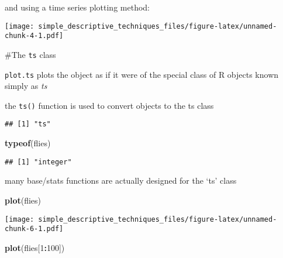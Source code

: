 \documentclass[]{article}
\newenvironment{Shaded}{\begin{snugshade}}{\end{snugshade}}
\newcommand{\DecValTok}[1]{\textcolor[rgb]{0.00,0.00,0.81}{#1}}
\newcommand{\KeywordTok}[1]{\textcolor[rgb]{0.13,0.29,0.53}{\textbf{#1}}}
\newcommand{\NormalTok}[1]{#1}
\newcommand{\OperatorTok}[1]{\textcolor[rgb]{0.81,0.36,0.00}{\textbf{#1}}}
\begin{document}
and using a time series plotting method:

\begin{Shaded}
\end{Shaded}

\texttt{[image: simple\_descriptive\_techniques\_files/figure-latex/unnamed-chunk-4-1.pdf]}

\#The \texttt{ts} class

\texttt{plot.ts} plots the object as if it were of the special class of
R objects known simply as \emph{ts}

the \texttt{ts()} function is used to convert objects to the ts class

\begin{Shaded}
\end{Shaded}

\begin{verbatim}
## [1] "ts"
\end{verbatim}

\begin{Shaded}
\begin{Highlighting}[]
\KeywordTok{typeof}\NormalTok{(flies)}
\end{Highlighting}
\end{Shaded}

\begin{verbatim}
## [1] "integer"
\end{verbatim}

many base/stats functions are actually designed for the `ts' class

\begin{Shaded}
\begin{Highlighting}[]
\KeywordTok{plot}\NormalTok{(flies)}
\end{Highlighting}
\end{Shaded}

\texttt{[image: simple\_descriptive\_techniques\_files/figure-latex/unnamed-chunk-6-1.pdf]}

\begin{Shaded}
\begin{Highlighting}[]
\KeywordTok{plot}\NormalTok{(flies[}\DecValTok{1}\OperatorTok{:}\DecValTok{100}\NormalTok{])}
\end{Highlighting}
\end{Shaded}
\end{document}
